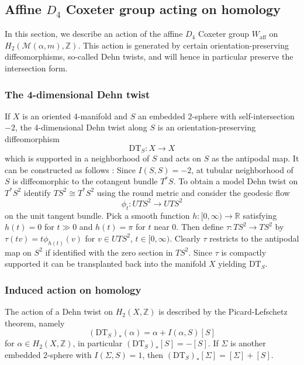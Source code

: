 \documentclass[12pt,letterpaper,reqno]{amsart}
\def\bm#1{#1}%
\def\mathbf#1{#1}%
\theoremstyle{remark}
\theoremstyle{definition}
\numberwithin{thm}{section}
\numberwithin{equation}{section}
\numberwithin{figure}{section}
\newcommand{\R}{\ensuremath{\mathbb R}}
\newcommand{\Z}{\ensuremath{\mathbb Z}}
\newcommand{\bfalpha}{\ensuremath{\bm \alpha}}
\newcommand{\aff}{\mathrm{aff}}
\newcommand{\bfm}{\mathbf{m}}
\begin{document}
\subsection{Affine \texorpdfstring{$D_4$}{D4} Coxeter group acting on homology}\label{sec:homologyaction}

In this section, we describe an action of the affine $D_4$ Coxeter group $W_\aff$ on $H_2(\mathcal{M}(\bfalpha,\bfm), \mathbb{Z})$. This action is generated by certain orientation-preserving diffeomorphisms, so-called Dehn twists, and will hence in particular preserve the intersection form. 


\subsubsection{The 4-dimensional Dehn twist}
If $X$ is an oriented 4-manifold and $S$ an embedded 2-sphere with self-intersection $-2$, the 4-dimensional Dehn twist along $S$ is an orientation-preserving diffeomorphism \[\mathrm{DT}_S : X \to X\] which is supported in a neighborhood of $S$ and acts on $S$ as the antipodal map. It can be constructed as follows \cite{Arnold,Seidel}: Since $I(S,S)=-2$, at tubular neighborhood of $S$ is diffeomorphic to the cotangent bundle $T^*S$. To obtain a model Dehn twist on $T^*S^2$ identify $TS^2 \cong T^*S^2$ using the round metric and consider the geodesic flow 
\[
\phi_t : UTS^2 \to UTS^2
\]
on the unit tangent bundle. Pick a smooth function $h: [0, \infty) \to \R$ satisfying $h(t) = 0$ for $t \gg 0$ and $h(t)= \pi$  for  $t$ near $0$. Then define $\tau : TS^2 \to TS^2$ by $\tau (tv) =t\phi_{h(t)}(v)$ for $v \in UTS^2$, $t \in [0, \infty)$. Clearly $\tau$ restricts to the antipodal map on $S^2$ if identified with the zero section in $TS^2$. Since $\tau$ is compactly supported it can be transplanted back into the manifold $X$ yielding $\mathrm{DT}_S$.  


\subsubsection{Induced action on homology}

The action of a Dehn twist on $H_2(X,\Z)$ is described by the Picard-Lefschetz theorem, namely
\[
(\mathrm{DT}_S)_* (\alpha) = \alpha  +I(\alpha, S)[S]
\]
for $\alpha \in H_2(X,\Z)$, in particular $(\mathrm{DT}_S)_*[S] =- [S]$. If $\Sigma$ is another embedded 2-sphere with $I(\Sigma,S)=1$, then $(\mathrm{DT}_S)_*[\Sigma] = [\Sigma] + [S]$.
\end{document}
